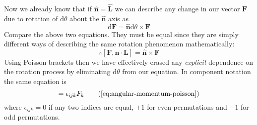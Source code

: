\documentclass[english,seminar,headertitle]{lecture}
\newcommand{\diff}{\textrm{d}}
\begin{document}
Now we already know that if $\mathbf{\hat{n}} = \mathbf{\hat{L}}$ we can describe any change in our vector $\mathbf{F}$ due to rotation of $\diff\theta$ about the $\mathbf{\hat{n}}$ axis as
\[
\diff \mathbf{F} = \mathbf{\hat{n}}\diff\theta \times \mathbf{F}
\]
Compare the above two equations. They must be equal since they are simply different ways of describing the same rotation phenomenon mathematically:
\begin{equation}
	\therefore [\mathbf{F}, \mathbf{\hat{n}\cdot L}] = \mathbf{\hat{n} \times F} \label{eq:angular-momentum-poisson}
\end{equation}%
Using Poisson brackets then we have effectively erased any \textit{explicit} dependence on the rotation process by eliminating $\diff\theta$ from our equation. In component notation the same equation is
\begin{equation}
	[F_i, L_j] = \epsilon_{ijk}F_k \tag{\ref{eq:angular-momentum-poisson}}
\end{equation}%
where $\epsilon_{ijk} = 0$ if any two indices are equal, $+1$ for even permutations and $-1$ for odd permutations.
\end{document}
